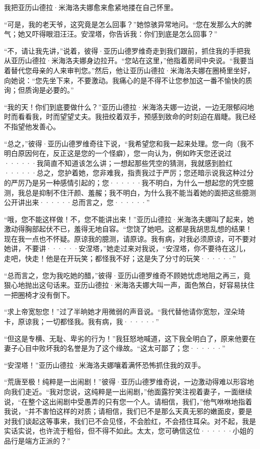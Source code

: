 \documentclass[12pt, UTF8]{ctexbook}
\begin{document}
\par 我把亚历山德拉·米海洛夫娜愈来愈紧地搂在自己怀里。
\par “可是，我的老天爷，这究竟是怎么回事？”她惊骇异常地问。“您在发那么大的脾气；她又吓得眼泪汪汪。安涅塔，你告诉我：你们到底是怎么回事？”
\par “不，请让我先讲，”说着，彼得·亚历山德罗维奇走到我们跟前，抓住我的手把我从亚历山德拉·米海洛夫娜身边拉开。“您站在这里，”他指着房间中央说。“我要当着替代您母亲的人来审判您。”然后，他让亚历山德拉·米海洛夫娜在圈椅里坐好，向她说：“您先坐下来，不要激动。我痛心的是不得不让您参加这一番不愉快的质询；但质询是必要的。”
\par “我的天！你们到底要做什么？”亚历山德拉·米海洛夫娜一边说，一边无限郁闷地时而看看我，时而望望丈夫。我扭绞着双手，预感到致命的时刻迫在眉睫。我已经不指望他发善心。
\par “总之，”彼得·亚历山德罗维奇往下说，“我希望您和我一起来处理。您一向（我不明白原因何在，反正这是您的一个怪癖），您一向认为，例如昨天您还说过······我简直不知道该怎么讲；一想起那些凭空的猜测，我就感到脸红······总之，您护着她，您非难我，指责我过于严厉；您还暗示说我这种过分的严厉乃是另一种感情引起的；您······我不明白，为什么一想起您的凭空臆测，我总是抑制不住汗颜、羞赧；我不明白，为什么我不能当着她的面把这些臆测公开讲出来······总而言之，您······”
\par “哦，您不能这样做！不，您不能讲出来！”亚历山德拉·米海洛夫娜叫了起来，她激动得胸部起伏不已，羞得无地自容。“您饶了她吧。这都是我胡思乱想的结果！现在我一点也不怀疑。原谅我的臆测，请原谅。我有病，对我必须原谅，可不要对她讲，不要讲······安涅塔，”她走过来对我说，“安涅塔，你不要待在这儿，走吧，快走！他是在开玩笑；都怪我不好；这是失了分寸的玩笑······”
\par “总而言之，您为我吃她的醋，”彼得·亚历山德罗维奇不顾她忧虑地阻之再三，竟狠心地抛出这句话来。亚历山德拉·米海洛夫娜大叫一声，面色煞白，好容易扶住一把圈椅才没有倒下。
\par “求上帝宽恕您！”过了半晌她才用微弱的声音说。“我代替他请你宽恕，涅朵琦卡，原谅我；一切都怪我。我有病，我······”
\par “但这是专横、无耻、卑劣的行为！”我狂怒地喊道，这下我全明白了，原来他要在妻子心目中败坏我的名誉是为了这个缘故。“这太可鄙了；您······”
\par “安涅塔！”亚历山德拉·米海洛夫娜嚷着满怀恐怖抓住我的双手。
\par “荒唐至极！纯粹是一出闹剧！”彼得·亚历山德罗维奇说，一边激动得难以形容地向我们走近。“我对您说，这纯粹是一出闹剧，”他面露狞笑注视着妻子，一面继续说，“在整个这出闹剧中受愚弄的只有您一个人。请相信，我们，”他气咻咻地指着我说，“并不害怕这样的对质；请相信，我们已不是那么天真无邪的嫩面皮，要是对我们谈起这等事来，我们已不会见怪，不会脸红，不会捂住耳朵。对不起，我是实话实说，也许流于粗俗，但不得不如此。太太，您可确信这位······小姐的品行是端方正派的？”
\end{document}

